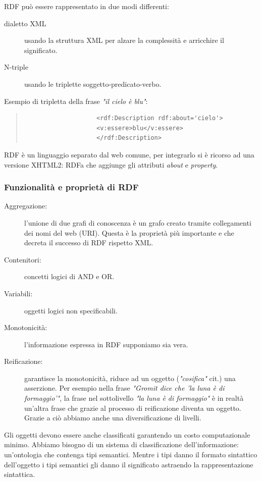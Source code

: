 				RDF può essere rappresentato in due modi differenti:
				\begin{description}
					\item[dialetto XML] usando la struttura XML per alzare la complessità e arricchire il significato.
					\item[N-triple] usando le triplette soggetto-predicato-verbo.
				\end{description}
				Esempio di tripletta della frase \emph{"il cielo è blu"}:
				\begin{quote}
				\begin{verbatim}
					<rdf:Description rdf:about='cielo'>
					<v:essere>blu</v:essere>
					</rdf:Description>
				\end{verbatim}
				\end{quote}
				
				RDF è un linguaggio separato dal web comune, per integrarlo si è ricorso ad una versione XHTML2: RDFa che aggiunge gli attributi \emph{about} e \emph{property}.
			
			\subsubsection{Funzionalità e proprietà di RDF}
			
				\begin{description}
					\item[Aggregazione:] l'unione di due grafi di conoscenza è un grafo creato tramite collegamenti dei nomi del web (URI). Questa è la proprietà più importante e che decreta il successo di RDF rispetto XML.
					\item[Contenitori:] concetti logici di AND e OR.
					\item[Variabili:] oggetti logici non specificabili.
					\item[Monotonicità:] l'informazione espressa in RDF supponiamo sia vera.
					\item[Reificazione:] garantisce la monotonicità, riduce ad un oggetto (\emph{"cosifica"} cit.) una asserzione. Per esempio nella frase \emph{"Gromit dice che 'la luna è di formaggio'"}, la frase nel sottolivello \emph{"la luna è di formaggio"} è in realtà un'altra frase che grazie al processo di reificazione diventa un oggetto. Grazie a ciò abbiamo anche una diversificazione di livelli.
				\end{description}
				
				Gli oggetti devono essere anche classificati garantendo un costo computazionale minimo. Abbiamo bisogno di un sistema di classificazione dell'informazione: un'ontologia che contenga tipi semantici. Mentre i tipi danno il formato sintattico dell'oggetto i tipi semantici gli danno il significato astraendo la rappresentazione sintattica.
				
